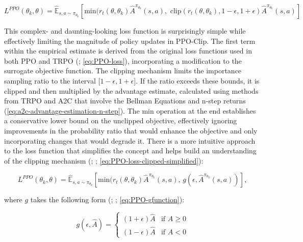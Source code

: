 \begin{equation}
    L^{PPO}(\theta_k, \theta) = \mathbb{\hat{E}}_{s, a \sim \pi_{\theta_k}} \left [ \text{min}(r_t(\theta, \theta_k) \hat{A}^{\pi_{\theta_k}}(s, a),\text{ clip}(r_t(\theta, \theta_k), 1-\epsilon, 1+\epsilon)\hat{A}^{\pi_{\theta_k}}(s, a)\right]
    \label{eq:PPO-loss-clipped}
\end{equation}


\noindent This complex- and daunting-looking loss function is surprisingly simple while effectively limiting the magnitude of policy updates in PPO-Clip. The first term within the empirical estimate is derived from the original loss functions used in both PPO and TRPO (\textcolor{deepblue}{\cite{schulman2017proximal}; \autoref{eq:PPO-loss}}), incorporating a modification to the surrogate objective function. The clipping mechanism limits the importance sampling ratio to the interval [$1-\epsilon, 1+\epsilon$]. If the ratio exceeds these bounds, it is clipped and then multiplied by the advantage estimate, calculated using methods from TRPO and A2C that involve the Bellman Equations and n-step returns (\textcolor{deepblue}{\autoref{eq:a2c-advantage-estimation-n-step}}). The min operation at the end establishes a conservative lower bound on the unclipped objective, effectively ignoring improvements in the probability ratio that would enhance the objective and only incorporating changes that would degrade it. There is a more intuitive approach to the loss function that simplifies the concept and helps build an understanding of the clipping mechanism (\textcolor{deepblue}{\cite{SpinningUp2018}; \cite{schulman2017proximal}; \autoref{eq:PPO-loss-clipped-simplified}}):

\begin{equation}
    L^{PPO}(\theta_k, \theta) = \mathbb{\hat{E}}_{s, a \sim \pi_{\theta_k}} \left [ \text{min}(r_t(\theta, \theta_k) \hat{A}^{\pi_{\theta_k}}(s, a)\text{, }g(\epsilon, \hat{A}^{\pi_{\theta_k}}(s, a))\right],
    \label{eq:PPO-loss-clipped-simplified}
\end{equation}

\noindent where $g$ takes the following form (\textcolor{deepblue}{\cite{SpinningUp2018}; \cite{schulman2017proximal}; \autoref{eq:PPO-gfunction}}):

\begin{equation}
    g(\epsilon, \hat{A}) = 
        \begin{cases} 
        (1 + \epsilon)\hat{A} & \text{if } \hat{A} \geq 0 \\
        (1 - \epsilon)\hat{A} & \text{if } \hat{A} < 0 
        \end{cases}
    \label{eq:PPO-gfunction}
\end{equation}

